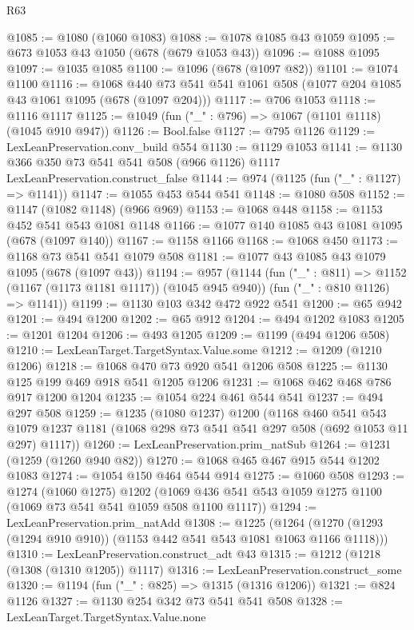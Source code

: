 \begin{lexlean}{R63}
\begin{coremodule}
@1085 := @1080 (@1060 @1083)
@1088 := @1078 @1085 @43 @1059
@1095 := @673 @1053 @43 @1050 (@678 (@679 @1053 @43))
@1096 := @1088 @1095
@1097 := @1035 @1085
@1100 := @1096 (@678 (@1097 @82))
@1101 := @1074 @1100
@1116 := @1068 @440 @73 @541 @541 @1061 @508 (@1077 @204 @1085 @43 @1061 @1095 (@678 (@1097 @204)))
@1117 := @706 @1053
@1118 := @1116 @1117
@1125 := @1049 (fun ("_" : @796) => @1067 (@1101 @1118) (@1045 @910 @947))
@1126 := Bool.false
@1127 := @795 @1126
@1129 := LexLeanPreservation.conv_build @554
@1130 := @1129 @1053
@1141 := @1130 @366 @350 @73 @541 @541 @508 (@966 @1126) @1117 LexLeanPreservation.construct_false
@1144 := @974 (@1125 (fun ("_" : @1127) => @1141))
@1147 := @1055 @453 @544 @541
@1148 := @1080 @508
@1152 := @1147 (@1082 @1148) (@966 @969)
@1153 := @1068 @448
@1158 := @1153 @452 @541 @543 @1081 @1148
@1166 := @1077 @140 @1085 @43 @1081 @1095 (@678 (@1097 @140))
@1167 := @1158 @1166
@1168 := @1068 @450
@1173 := @1168 @73 @541 @541 @1079 @508
@1181 := @1077 @43 @1085 @43 @1079 @1095 (@678 (@1097 @43))
@1194 := @957
    (@1144
      (fun ("_" : @811) => @1152 (@1167 (@1173 @1181 @1117)) (@1045 @945 @940))
      (fun ("_" : @810 @1126) => @1141))
@1199 := @1130 @103 @342 @472 @922 @541
@1200 := @65 @942
@1201 := @494 @1200
@1202 := @65 @912
@1204 := @494 @1202 @1083
@1205 := @1201 @1204
@1206 := @493 @1205
@1209 := @1199 (@494 @1206 @508)
@1210 := LexLeanTarget.TargetSyntax.Value.some
@1212 := @1209 (@1210 @1206)
@1218 := @1068 @470 @73 @920 @541 @1206 @508
@1225 := @1130 @125 @199 @469 @918 @541 @1205 @1206
@1231 := @1068 @462 @468 @786 @917 @1200 @1204
@1235 := @1054 @224 @461 @544 @541
@1237 := @494 @297 @508
@1259 := @1235
    (@1080 @1237)
    @1200
    (@1168
      @460
      @541
      @543
      @1079
      @1237
      @1181
      (@1068 @298 @73 @541 @541 @297 @508 (@692 @1053 @11 @297) @1117))
@1260 := LexLeanPreservation.prim_natSub
@1264 := @1231 (@1259 (@1260 @940 @82))
@1270 := @1068 @465 @467 @915 @544 @1202 @1083
@1274 := @1054 @150 @464 @544 @914
@1275 := @1060 @508
@1293 := @1274
    (@1060 @1275)
    @1202
    (@1069 @436 @541 @543 @1059 @1275 @1100 (@1069 @73 @541 @541 @1059 @508 @1100 @1117))
@1294 := LexLeanPreservation.prim_natAdd
@1308 := @1225
    (@1264 (@1270 (@1293 (@1294 @910 @910)) (@1153 @442 @541 @543 @1081 @1063 @1166 @1118)))
@1310 := LexLeanPreservation.construct_adt @43
@1315 := @1212 (@1218 (@1308 (@1310 @1205)) @1117)
@1316 := LexLeanPreservation.construct_some
@1320 := @1194 (fun ("_" : @825) => @1315 (@1316 @1206))
@1321 := @824 @1126
@1327 := @1130 @254 @342 @73 @541 @541 @508
@1328 := LexLeanTarget.TargetSyntax.Value.none

\end{coremodule}
\end{lexlean}
